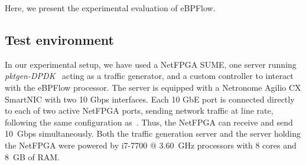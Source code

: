 
Here, we present the experimental evaluation of eBPFlow. 

\subsection{Test environment} 
\label{sec:experiments}



In our experimental setup, we have used a NetFPGA SUME, one server running \textit{pktgen-DPDK}~\cite{Pktgen2016} acting as a traffic generator, and a custom controller to interact with the eBPFlow processor. The server is equipped with a Netronome Agilio CX SmartNIC with two 10 Gbps interfaces. Each 10 GbE port is connected directly to each of two active NetFPGA ports, sending network traffic at line rate, following the same configuration as~\cite{FlowBlaze2019}. Thus, the NetFPGA can receive and send 10~Gbps simultaneously.  Both the traffic generation server and the server holding the NetFPGA were powered by i7-7700 \(@\) 3.60~GHz processors with 8 cores and 8~GB of RAM.




